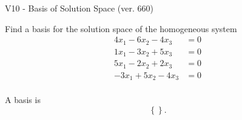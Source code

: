 \begin{exercise}
  \begin{exerciseTitle}V10 - Basis of Solution Space (ver. 660)\end{exerciseTitle}
  \begin{exerciseStatement}
    Find a basis for the solution space of the homogeneous system 
\begin{align*}
 4 x_ 1 -6 x_ 2 -4 x_ 3 &= 0  \\ 
  1 x_ 1 -3 x_ 2 + 5 x_ 3 &= 0  \\ 
  5 x_ 1 -2 x_ 2 + 2 x_ 3 &= 0  \\ 
  -3 x_ 1 + 5 x_ 2 -4 x_ 3 &= 0  \\ 
 \end{align*}


 
  \end{exerciseStatement}

  \begin{exerciseAnswer}
   A basis is   
\[\left\{\right\}.\]

  


  \end{exerciseAnswer}
\end{exercise}